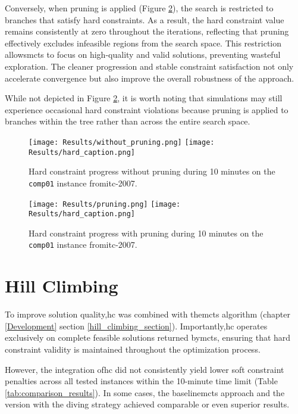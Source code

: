 Conversely, when pruning is applied (Figure \ref{fig:pruning_result}), the search is restricted to branches that satisfy hard constraints. As a result, the hard constraint value remains consistently at zero throughout the iterations, reflecting that pruning effectively excludes infeasible regions from the search space. This restriction allows\ac{mcts} to focus on high-quality and valid solutions, preventing wasteful exploration. The cleaner progression and stable constraint satisfaction not only accelerate convergence but also improve the overall robustness of the approach. 

While not depicted in Figure \ref{fig:pruning_result}, it is worth noting that simulations may still experience occasional hard constraint violations because pruning is applied to branches within the tree rather than across the entire search space.

\begin{figure}
 \centering
     \texttt{[image: Results/without\_pruning.png]}
     \texttt{[image: Results/hard\_caption.png]}
     \caption{Hard constraint progress without pruning during 10 minutes on the \texttt{comp01} instance from\ac{itc-2007}.}
     \label{fig:without_pruning_result}
\end{figure}

\begin{figure}
 \centering
    \texttt{[image: Results/pruning.png]}
    \texttt{[image: Results/hard\_caption.png]}
    \caption{Hard constraint progress with pruning during 10 minutes on the \texttt{comp01} instance from\ac{itc-2007}.}
    \label{fig:pruning_result}
\end{figure}

\section{Hill Climbing}

To improve solution quality,\ac{hc} was combined with the\ac{mcts} algorithm (chapter \ref{Development} section \ref{hill_climbing_section}). Importantly,\ac{hc} operates exclusively on complete feasible solutions returned by\ac{mcts}, ensuring that hard constraint validity is maintained throughout the optimization process.

However, the integration of\ac{hc} did not consistently yield lower soft constraint penalties across all tested instances within the 10-minute time limit (Table \ref{tab:comparison_results}). In some cases, the baseline\ac{mcts} approach and the version with the diving strategy achieved comparable or even superior results.

